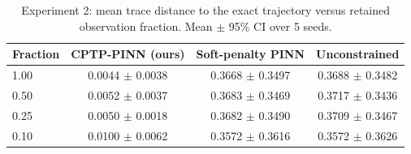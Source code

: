 \begin{table}[ht]
\centering
\caption{Experiment 2: mean trace distance to the exact trajectory versus retained observation fraction. Mean $\pm$ 95\% CI over 5 seeds.}
\label{tab:exp2}
\begin{tabular}{lccc}
\toprule
Fraction & CPTP-PINN (ours) & Soft-penalty PINN & Unconstrained \\
\midrule
1.00 & 0.0044 $\pm$ 0.0038 & 0.3668 $\pm$ 0.3497 & 0.3688 $\pm$ 0.3482 \\
0.50 & 0.0052 $\pm$ 0.0037 & 0.3683 $\pm$ 0.3469 & 0.3717 $\pm$ 0.3436 \\
0.25 & 0.0050 $\pm$ 0.0018 & 0.3682 $\pm$ 0.3490 & 0.3709 $\pm$ 0.3467 \\
0.10 & 0.0100 $\pm$ 0.0062 & 0.3572 $\pm$ 0.3616 & 0.3572 $\pm$ 0.3626 \\
\bottomrule
\end{tabular}
\end{table}
